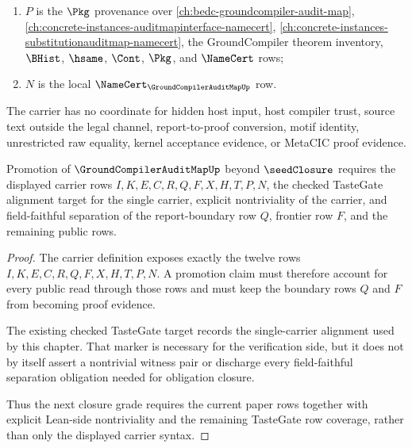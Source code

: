 \begin{definition}
\begin{enumerate}
\item $P$ is the $\Pkg$ provenance over \autoref{ch:bedc-groundcompiler-audit-map}, \autoref{ch:concrete-instances-auditmapinterface-namecert}, \autoref{ch:concrete-instances-substitutionauditmap-namecert}, the GroundCompiler theorem inventory, $\BHist$, $\hsame$, $\Cont$, $\Pkg$, and $\NameCert$ rows;
\item $N$ is the local $\NameCert_{\GroundCompilerAuditMapUp}$ row.
\end{enumerate}
The carrier has no coordinate for hidden host input, host compiler trust, source text outside the legal channel, report-to-proof conversion, motif identity, unrestricted raw equality, kernel acceptance evidence, or MetaCIC proof evidence.
\end{definition}

\begin{theorem}
\label{thm:ground-compiler-audit-map-obligation-closure}
Promotion of $\GroundCompilerAuditMapUp$ beyond $\seedClosure$ requires the displayed carrier rows $I,K,E,C,R,Q,F,X,H,T,P,N$, the checked TasteGate alignment target for the single carrier, explicit nontriviality of the carrier, and field-faithful separation of the report-boundary row $Q$, frontier row $F$, and the remaining public rows.
\end{theorem}
\begin{proof}
The carrier definition exposes exactly the twelve rows $I,K,E,C,R,Q,F,X,H,T,P,N$. A promotion claim must therefore account for every public read through those rows and must keep the boundary rows $Q$ and $F$ from becoming proof evidence.

The existing checked TasteGate target records the single-carrier alignment used by this chapter. That marker is necessary for the verification side, but it does not by itself assert a nontrivial witness pair or discharge every field-faithful separation obligation needed for obligation closure.

Thus the next closure grade requires the current paper rows together with explicit Lean-side nontriviality and the remaining TasteGate row coverage, rather than only the displayed carrier syntax.
\end{proof}


